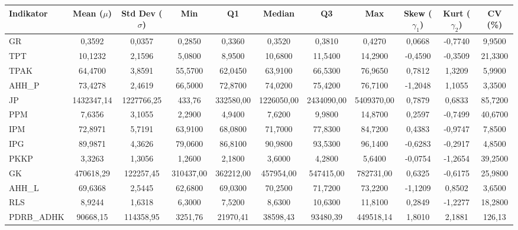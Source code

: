 \begin{adjustbox}{max width=\textwidth}
\small
\begin{tabular}{|>{\centering\arraybackslash}p{2.5cm}|c|c|c|c|c|c|c|c|c|c|}
\hline
\textbf{Indikator} & \textbf{Mean ($\mu$)} & \textbf{Std Dev ($\sigma$)} & \textbf{Min} & \textbf{Q1} & \textbf{Median} & \textbf{Q3} & \textbf{Max} & \textbf{Skew ($\gamma_1$)} & \textbf{Kurt ($\gamma_2$)} & \textbf{CV (\%)} \\
\hline
GR & 0,3592 & 0,0357 & 0,2850 & 0,3360 & 0,3520 & 0,3810 & 0,4270 & 0,0668 & -0,7740 & 9,9500 \\
TPT & 10,1232 & 2,1596 & 5,0800 & 8,9500 & 10,6800 & 11,5400 & 14,2900 & -0,4590 & -0,3509 & 21,3300 \\
TPAK & 64,4700 & 3,8591 & 55,5700 & 62,0450 & 63,9100 & 66,5300 & 76,9650 & 0,7812 & 1,3209 & 5,9900 \\
AHH\_P & 73,4278 & 2,4619 & 66,5000 & 72,8700 & 74,0200 & 75,4200 & 76,7100 & -1,2048 & 1,1055 & 3,3500 \\
JP & 1432347,14 & 1227766,25 & 433,76 & 332580,00 & 1226050,00 & 2434090,00 & 5409370,00 & 0,7879 & 0,6833 & 85,7200 \\
PPM & 7,6356 & 3,1055 & 2,2900 & 4,9400 & 7,6200 & 9,9800 & 14,8700 & 0,2597 & -0,7499 & 40,6700 \\
IPM & 72,8971 & 5,7191 & 63,9100 & 68,0800 & 71,7000 & 77,8300 & 84,7200 & 0,4383 & -0,9747 & 7,8500 \\
IPG & 89,9871 & 4,3626 & 79,0600 & 86,8100 & 90,9800 & 93,5300 & 96,1400 & -0,6283 & -0,2917 & 4,8500 \\
PKKP & 3,3263 & 1,3056 & 1,2600 & 2,1800 & 3,6000 & 4,2800 & 5,6400 & -0,0754 & -1,2654 & 39,2500 \\
GK & 470618,29 & 122257,45 & 310437,00 & 362212,00 & 457954,00 & 547415,00 & 782731,00 & 0,6325 & -0,6175 & 25,9800 \\
AHH\_L & 69,6368 & 2,5445 & 62,6800 & 69,0300 & 70,2500 & 71,7200 & 73,2200 & -1,1209 & 0,8502 & 3,6500 \\
RLS & 8,9244 & 1,6318 & 6,3000 & 7,5200 & 8,6300 & 10,6300 & 11,8100 & 0,2849 & -1,2277 & 18,2800 \\
PDRB\_ADHK & 90668,15 & 114358,95 & 3251,76 & 21970,41 & 38598,43 & 93480,39 & 449518,14 & 1,8010 & 2,1881 & 126,13 \\
\hline
\end{tabular}
\end{adjustbox}
